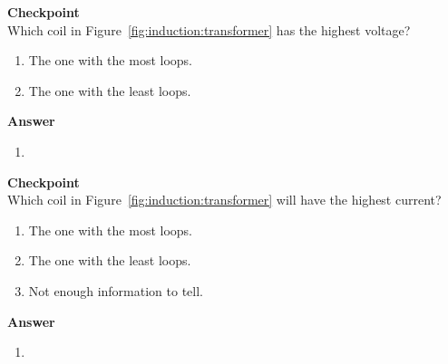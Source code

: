 \begin{framed}
\textbf{Checkpoint}\\
Which coil in Figure~\ref{fig:induction:transformer} has the highest voltage?

\begin{enumerate}
\item The one with the most loops.
\item The one with the least loops.
\end{enumerate}

\begin{framed}
\textbf{Answer}\\
\begin{enumerate}
\item
\end{enumerate}
\end{framed}
\end{framed}

\begin{framed}
\textbf{Checkpoint}\\
Which coil in Figure~\ref{fig:induction:transformer} will have the highest current?

\begin{enumerate}
\item The one with the most loops.
\item The one with the least loops.
\item Not enough information to tell.
\end{enumerate}

\begin{framed}
\textbf{Answer}\\
\begin{enumerate}[resume]
\item
\end{enumerate}
\end{framed}
\end{framed}

